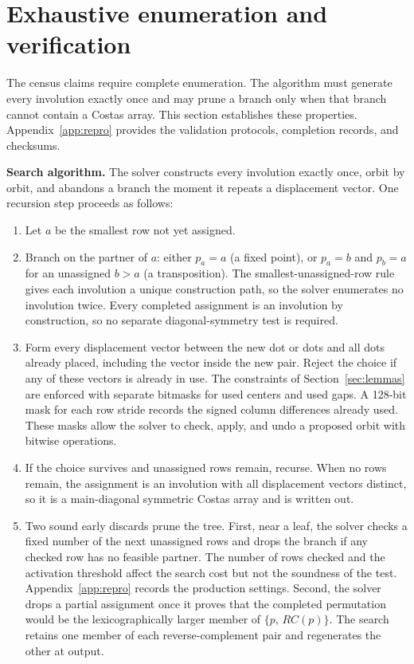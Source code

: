 \documentclass[11pt]{article}
\begin{document}
\section{Exhaustive enumeration and verification}
\label{sec:method}

The census claims require complete enumeration.  The algorithm must generate
every involution exactly once and may prune a branch only when that branch
cannot contain a Costas array.  This section establishes these properties.
Appendix~\ref{app:repro} provides the validation protocols, completion
records, and checksums.

\textbf{Search algorithm.}  The solver constructs every involution exactly once,
orbit by orbit, and abandons a branch the moment it repeats a displacement
vector.  One recursion step proceeds as follows:

\begin{enumerate}
\item Let $a$ be the smallest row not yet assigned.
\item Branch on the partner of $a$: either $p_a=a$ (a fixed point), or
$p_a=b$ and $p_b=a$ for an unassigned $b>a$ (a transposition).  The
smallest-unassigned-row rule gives each involution a unique construction
path, so the solver enumerates no involution twice.  Every completed
assignment is an involution by construction, so no separate
diagonal-symmetry test is required.
\item Form every displacement vector between the new dot or dots and all
dots already placed, including the vector inside the new pair.  Reject
the choice if any of these vectors is already in use.  The constraints of
Section~\ref{sec:lemmas} are enforced with separate bitmasks for used centers
and used gaps.  A 128-bit mask for each row stride records the signed column
differences already used.  These masks allow the solver to check, apply, and
undo a proposed orbit with bitwise operations.
\item If the choice survives and unassigned rows remain, recurse.  When
no rows remain, the assignment is an involution with all displacement
vectors distinct, so it is a main-diagonal symmetric Costas array and is
written out.
\item Two sound early discards prune the tree.  First, near a leaf, the
solver checks a fixed number of the next unassigned rows and drops the
branch if any checked row has no feasible partner.  The number of rows
checked and the activation threshold affect the search cost but not the
soundness of the test.  Appendix~\ref{app:repro} records the production
settings.  Second, the solver drops a partial assignment once it proves
that the completed permutation would be the lexicographically larger member
of $\{p,\,RC(p)\}$.  The search retains one member of each reverse-complement
pair and regenerates the other at output.
\end{enumerate}
\end{document}

